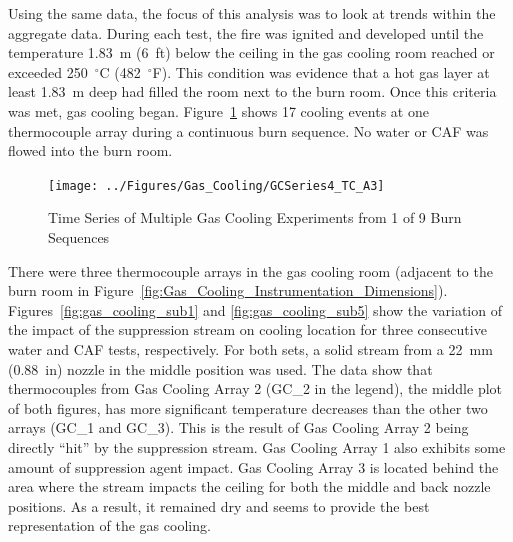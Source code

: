 \documentclass[12pt,oneside]{book}
\begin{document}
Using the same data, the focus of this analysis was to look at trends within the aggregate data. During each test, the fire was ignited and developed until the temperature 1.83~m (6~ft) below the ceiling in the gas cooling room reached or exceeded 250~$^{\circ}$C (482~$^{\circ}$F).  This condition was evidence that a hot gas layer at least 1.83~m deep had filled the room next to the burn room.  Once this criteria was met, gas cooling began. Figure~\ref{fig:gas_cooling_exp4} shows 17 cooling events at one thermocouple array during a continuous burn sequence.  No water or CAF was flowed into the burn room.   

\begin{figure}[ht!]
	\texttt{[image: ../Figures/Gas\_Cooling/GCSeries4\_TC\_A3]}
	\caption{Time Series of Multiple Gas Cooling Experiments from 1 of 9 Burn Sequences}
	\label{fig:gas_cooling_exp4}
\end{figure}

There were three thermocouple arrays in the gas cooling room (adjacent to the burn room in Figure~\ref{fig:Gas_Cooling_Instrumentation_Dimensions}). Figures~\ref{fig:gas_cooling_sub1} and \ref{fig:gas_cooling_sub5} show the variation of the impact of the suppression stream on cooling location for three consecutive water and CAF tests, respectively. For both sets, a solid stream from a 22~mm (0.88~in) nozzle in the middle position was used. The data show that thermocouples from Gas Cooling Array 2 (GC\_2 in the legend), the middle plot of both figures, has more significant temperature decreases than the other two arrays (GC\_1 and GC\_3). This is the result of Gas Cooling Array 2 being directly ``hit'' by the suppression stream.  Gas Cooling Array 1 also exhibits some amount of suppression agent impact.  Gas Cooling Array 3 is located behind the area where the stream impacts the ceiling for both the middle and back nozzle positions.  As a result, it remained dry and seems to provide the best representation of the gas cooling.
\end{document}
